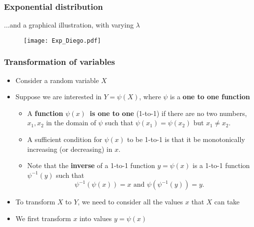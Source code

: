 \documentclass[notes=show,smaller,handout]{beamer}\usepackage[]{graphicx}\usepackage[]{color}
\newenvironment{stepitemize}{\begin{itemize}[<+->]}{\end{itemize} }
\begin{document}
\begin{frame}
\frametitle{Exponential distribution}


\begin{example} [cont'd]

...and a graphical illustration, with varying $\lambda$

\begin{figure}[ptb]\centering
\texttt{[image: Exp\_Diego.pdf]}%
\end{figure}%

\end{example}
\end{frame}%




\begin{frame}

\frametitle{Transformation of variables}

\begin{stepitemize}
\item Consider a random variable $X$

\item Suppose we are interested in $Y=\psi(X)$, where $\psi $ is a \textbf{%
one to one function}

\begin{stepitemize}
\item A \textbf{function }$\psi \left( x\right) $\textbf{\ is one to one}
(1-to-1) if there are no two numbers, $x_{1},x_{2}$ in the domain of $\psi $
such that $\psi \left( x_{1}\right) =\psi \left( x_{2}\right) $ but $%
x_{1}\neq x_{2}$.

\item A sufficient condition for $\psi \left( x\right) $ to be 1-to-1 is
that it be monotonically increasing (or decreasing) in $x$.

\item Note that the \textbf{inverse} of a 1-to-1 function $y=\psi \left(
x\right) $ is a 1-to-1 function $\psi^{-1}\left( y\right) $ such that
\begin{equation*}
\psi ^{-1}\left( \psi \left( x\right) \right) =x\text{ and }\psi \left( \psi
^{-1}\left( y\right) \right) =y.
\end{equation*}
\end{stepitemize}

\item To transform $X$ to $Y$, we need to consider all the values $x$ that $%
X $ can take

\item We first transform $x$ into values $y=\psi (x)$
\end{stepitemize}

\end{frame}%
\end{document}
